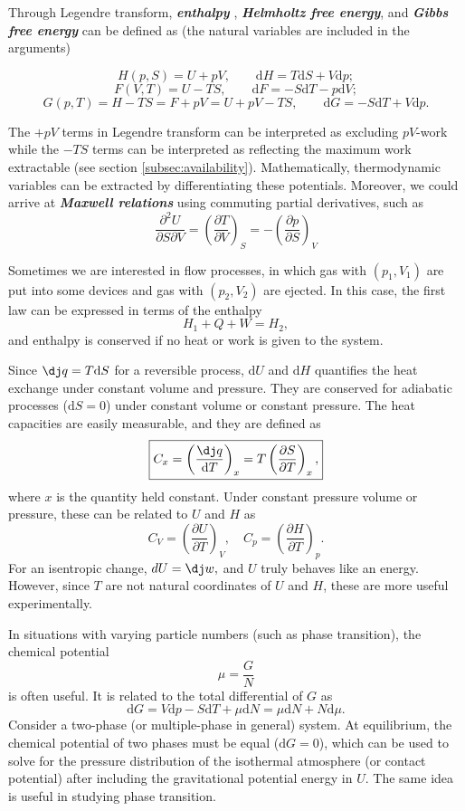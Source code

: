 \documentclass{article}
\theoremstyle{nonumberplain}
\begin{document}
Through Legendre transform, \textit{\textbf{enthalpy}} , \textit{\textbf{Helmholtz free energy}}, and \textit{\textbf{Gibbs free energy}} can be defined as (the natural variables are included in the arguments)

\[
    \boxed{
    H(p,S) = U + p V, \qquad \mathrm{d} H = T \mathrm{d} S + V \mathrm{d} p ;}
\]
\[
    \boxed{
    F(V,T) = U - TS, \qquad \mathrm{d} F = - S \mathrm{d} T - p \mathrm{d} V;}
\]
\[
    \boxed{
    G(p,T) = H - TS = F + p V = U + pV - TS, \qquad \mathrm{d} G = -S \mathrm{d} T + V \mathrm{d} p.}
\]

The $+pV$ terms in Legendre transform can be interpreted as excluding $pV$-work while the $-TS$ terms can be interpreted as reflecting the maximum work extractable (see section \ref{subsec:availability}). Mathematically, thermodynamic variables can be extracted by differentiating these potentials. Moreover, we could arrive at \textit{\textbf{Maxwell relations}} using commuting partial derivatives, such as 
\[
    \frac{\partial ^{2} U}{\partial S \partial V}  = 
    \left( \frac{\partial T}{\partial V} \right)_{S} = 
    -\left( \frac{\partial p}{\partial S} \right)_{V} 
\] 

Sometimes we are interested in flow processes, in which gas with $(p_1, V_1)$ are put into some devices and gas with $(p_2, V_2)$ are ejected. In this case, the first law can be expressed in terms of the enthalpy
\[
    \boxed{H_1 + Q + W = H_2,}
\]
and enthalpy is conserved if no heat or work is given to the system. 

Since $\dj q = T \mathrm{d} S$ for a reversible process, $\mathrm{d} U$ and $\mathrm{d} H$ quantifies the heat exchange under constant volume and pressure. They are conserved for adiabatic processes ($\mathrm{d} S = 0$) under constant volume or constant pressure. 
The heat capacities are easily measurable, and they are defined as
\[
    \boxed{C_x = \left( \frac{\mathrm{\dj}q}{\mathrm{d}T} \right)_x 
    = T \left( \frac{\partial S}{\partial T} \right)_{x}, 
    } 
\]
where $x$ is the quantity held constant. Under constant pressure volume or pressure, these can be related to $U$ and $H$ as
\[
    C_V = \left( \frac{\partial U}{\partial T} \right)_{V},  \quad 
    C_p = \left( \frac{\partial H}{\partial T} \right)_{p}.
\]
For an isentropic change, $dU = \mathrm{\dj} w,$ and $U$ truly behaves like an energy. However, since $T$ are not natural coordinates of $U$ and $H$, these are more useful experimentally. 

In situations with varying particle numbers (such as phase transition), the chemical potential
\[
    \boxed{\mu = \frac{G}{N}}
\]
is often useful. It is related to the total differential of $G$ as 
\[
    \mathrm{d} G = V\mathrm{d} p - S \mathrm{d} T + \mu \mathrm{d} N
     = \mu \mathrm{d} N + N \mathrm{d} \mu. 
\]
Consider a two-phase (or multiple-phase in general) system. At equilibrium, the chemical potential of two phases must be equal ($\mathrm{d} G = 0$), which can be used to solve for the pressure distribution of the isothermal atmosphere (or contact potential) after including the gravitational potential energy in $U.$ The same idea is useful in studying phase transition. 
\end{document}
